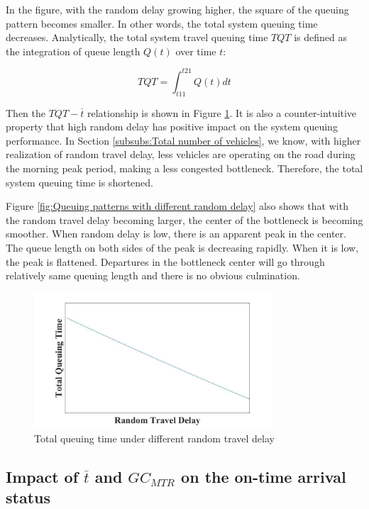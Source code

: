 \documentclass[a4paper,11pt]{article}
\begin{document}
In the figure, with the random delay growing higher, the square of the queuing pattern becomes smaller. In other words, the total system queuing time decreases. Analytically, the total system travel queuing time $TQT$ is defined as the integration of queue length $Q(t)$ over time $t$:

\begin{equation}
    TQT = \int^{t21}_{t11} Q(t) dt
\end{equation}

Then the $TQT-\overline{t}$ relationship is shown in Figure \ref{fig:Total queuing time under different random travel delay}. It is also a counter-intuitive property that high random delay has positive impact on the system queuing performance. In Section \ref{subsubs:Total number of vehicles}, we know, with higher realization of random travel delay, less vehicles are operating on the road during the morning peak period, making a less congested bottleneck. Therefore, the total system queuing time is shortened. 

Figure \ref{fig:Queuing patterns with different random delay} also shows that with the random travel delay becoming larger, the center of the bottleneck is becoming smoother. When random delay is low, there is an apparent peak in the center. The queue length on both sides of the peak is decreasing rapidly. When it is low, the peak is flattened. Departures in the bottleneck center will go through relatively same queuing length and there is no obvious culmination. 

\begin{figure}
	\centering
	\includegraphics[width=3.5in]{image/TQT.jpg}
	\caption{Total queuing time under different random travel delay}
	\label{fig:Total queuing time under different random travel delay}
\end{figure}


\subsection{Impact of $\overline{t}$ and $GC_{MTR}$ on the on-time arrival status}\label{subs:impact on the on-time arrival status}
\end{document}
